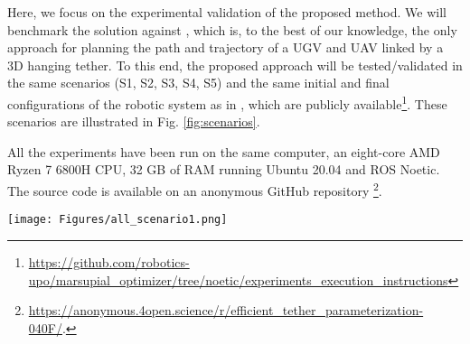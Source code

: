 
Here, we focus on the experimental validation of the proposed method. We will benchmark the solution against \cite{smartinezr2023}, which is, to the best of our knowledge, the only approach for planning the path and trajectory of a UGV and UAV linked by a 3D hanging tether. To this end, the proposed approach will be tested/validated in the same scenarios (S1, S2, S3, S4, S5) and the same initial and final configurations of the robotic system as in \cite{smartinezr2023}, which are publicly available\footnote{\url{https://github.com/robotics-upo/marsupial_optimizer/tree/noetic/experiments_execution_instructions}}. These scenarios are illustrated in Fig. \ref{fig:scenarios}. 


All the experiments have been run on the same computer, an eight-core AMD Ryzen 7 6800H CPU, 32 GB of RAM running Ubuntu 20.04 and ROS Noetic. The source code is available on an anonymous GitHub repository \footnote{\url{https://anonymous.4open.science/r/efficient_tether_parameterization-040F/}.}.

\begin{figure*}[t!]
  \centering
  \texttt{[image: Figures/all\_scenario1.png]}
  \caption{Scenarios considered for validation. S1: Open/constrained space with arc as obstacle. S2: Narrow/constrained space with denied access to UGV. S3: Confined space with outlet duct for UAV. S4: Collapsed Fire Station. S5: Open space gas station.}
  \label{fig:scenarios}
  \vspace*{-5mm}
\end{figure*}

